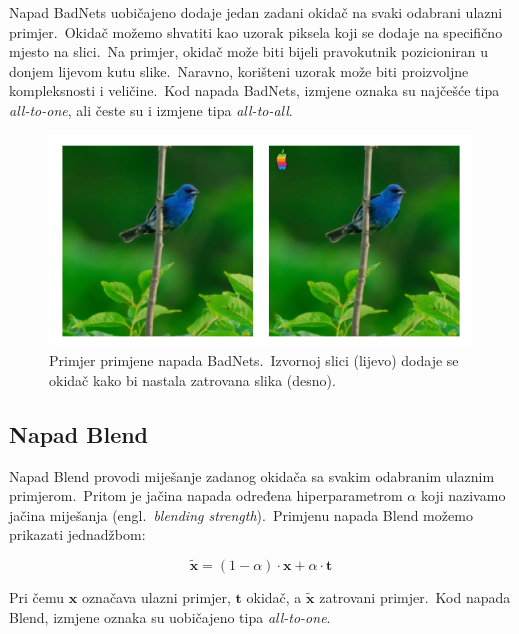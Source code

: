 \documentclass[diplomskirad]{fer}
\begin{document}
Napad BadNets uobičajeno dodaje jedan zadani okidač na svaki odabrani ulazni primjer.\ Okidač možemo shvatiti kao uzorak piksela koji se dodaje na specifično mjesto na slici.\ 
Na primjer, okidač može biti bijeli pravokutnik pozicioniran u donjem lijevom kutu slike.\ Naravno, korišteni uzorak može biti proizvoljne kompleksnosti i veličine.\ 
Kod napada BadNets, izmjene oznaka su najčešće tipa \textit{all-to-one}, ali česte su i izmjene tipa \textit{all-to-all}.\

\begin{figure}[h]
  \centering
  \includegraphics[scale=0.6]{./Slike/imagenet1k_uzorak_badnets.png}
  \caption{Primjer primjene napada BadNets.\ Izvornoj slici (lijevo) dodaje se okidač kako bi nastala zatrovana slika (desno).}
  \label{fig:badnets}
\end{figure}

\pagebreak
  
\subsection{Napad Blend}
\label{sub:blend}

Napad Blend provodi miješanje zadanog okidača sa svakim odabranim ulaznim primjerom.\ Pritom je jačina napada određena hiperparametrom $\alpha$ koji nazivamo jačina miješanja (engl.\ \textit{blending strength}).\ 
Primjenu napada Blend možemo prikazati jednadžbom:

\begin{equation}
  \bm{\tilde{x}} = (1 - \alpha) \cdot \bm{x} + \alpha \cdot \bm{t}
  \label{eq:blend}
\end{equation}

Pri čemu $\bm{x}$ označava ulazni primjer, $\bm{t}$ okidač, a $\bm{\tilde{x}}$ zatrovani primjer.\ Kod napada Blend, izmjene oznaka su uobičajeno tipa \textit{all-to-one}.\
\end{document}
